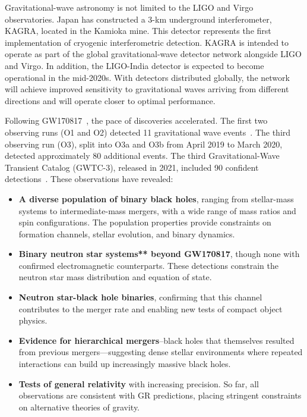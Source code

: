 Gravitational-wave astronomy is not limited to the LIGO and Virgo observatories.
Japan has constructed a $3$-km underground interferometer, KAGRA, located in the Kamioka mine\cite{_kagra_,ooba_kagra_,akutsu_kagra_2019}.
This detector represents the first implementation of cryogenic interferometric detection.
KAGRA is intended to operate as part of the global gravitational-wave detector network alongside LIGO and Virgo\cite{ohashimasatake_ligo_}.
In addition, the LIGO-India detector is expected to become operational in the mid-2020s.
With detectors distributed globally, the network will achieve improved sensitivity to gravitational waves arriving from different directions and will operate closer to optimal performance\cite{miller_new_2019}.

Following GW170817~\cite{abbott_properties_2019}, the pace of discoveries accelerated.
The first two observing runs (O1 and O2) detected 11 gravitational wave events~\cite{abbott_gwtc1_2019}.
The third observing run (O3), split into O3a and O3b from April 2019 to March 2020, detected approximately 80 additional events.
The third Gravitational-Wave Transient Catalog (GWTC-3), released in 2021, included 90 confident detections~\cite{abbott_gwtc3_2023}.
These observations have revealed:
\begin{itemize}
    \item \textbf{A diverse population of binary black holes}, ranging from stellar-mass systems to intermediate-mass mergers, with a wide range of mass ratios and spin configurations.
    The population properties provide constraints on formation channels, stellar evolution, and binary dynamics.


    \item \textbf{Binary neutron star systems** beyond GW170817}, though none with confirmed electromagnetic counterparts.
    These detections constrain the neutron star mass distribution and equation of state.

    \item \textbf{Neutron star-black hole binaries}, confirming that this channel contributes to the merger rate and enabling new tests of compact object physics.

    \item \textbf{Evidence for hierarchical mergers}--black holes that themselves resulted from previous mergers—suggesting dense stellar environments where repeated interactions can build up increasingly massive black holes.

    \item \textbf{Tests of general relativity} with increasing precision.
    So far, all observations are consistent with GR predictions, placing stringent constraints on alternative theories of gravity.

\end{itemize}


